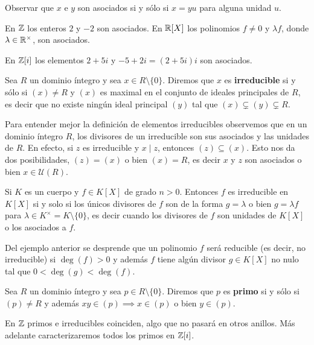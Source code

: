 Observar que $x$ e $y$ son asociados si y sólo si $x=yu$ para alguna unidad $u$. 

\begin{examples}
En $\mathbb{Z}$ los enteros $2$ y $-2$ son asociados. En $\mathbb{R}[X]$ los polinomios 
$f\ne 0$ y $\lambda f$, donde $\lambda\in\mathbb{R}^\times$, son asociados. 
\end{examples}

\begin{example}
En $\mathbb{Z}[i]$ los elementos $2+5i$ y $-5+2i=(2+5i)i$ son asociados. 
\end{example}

\begin{definition}
Sea $R$ un dominio íntegro y sea $x\in R\setminus\{0\}$. Diremos que  
$x$ es \textbf{irreducible} si y sólo si $(x)\ne R$ y $(x)$ es maximal en el conjunto de ideales principales de $R$, es decir que 
no existe ningún ideal principal $(y)$ tal que $(x)\subsetneq (y)\subsetneq R$.
\end{definition}

Para entender mejor la definición de elementos irreducibles observemos que en un dominio íntegro $R$, los divisores de un irreducible 
son sus asociados y las unidades de $R$. En efecto, si $z$ es irreducible y $x\mid z$, entonces $(z)\subseteq (x)$. Esto nos 
da dos posibilidades, $(z)=(x)$ o bien $(x)=R$, es decir $x$ y $z$ son asociados o bien $x\in\mathcal{U}(R)$.   

\begin{example}
Si $K$ es un cuerpo y $f\in K[X]$ de grado $n>0$.
Entonces $f$ es irreducible en $K[X]$ si y solo si los únicos divisores de $f$ son de la forma $g=\lambda$ o bien 
$g=\lambda f$ para $\lambda\in K^\times=K\setminus\{0\}$, es decir cuando los divisores de $f$ 
son unidades de $K[X]$ o los asociados a $f$. 
\end{example}

Del ejemplo anterior se desprende que un polinomio $f$ será reducible (es decir, no irreducible) si $\deg(f)>0$ y además 
$f$ tiene algún divisor $g\in K[X]$ no nulo 
tal que $0<\deg(g)<\deg(f)$.  

\begin{definition}
Sea $R$ un dominio íntegro y sea $p\in R\setminus\{0\}$. Diremos que  
$p$ es \textbf{primo} si y sólo si $(p)\ne R$ y además $xy\in (p)\implies x\in(p)$ o bien $y\in(p)$.   		
\end{definition}

En $\mathbb{Z}$ primos e irreducibles coinciden, algo que no pasará en otros anillos. Más adelante 
caracterizaremos todos los primos en $\mathbb{Z}[i]$. 


